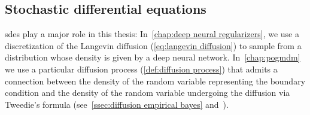 \subsection{Stochastic differential equations}
\Glspl{sde} play a major role in this thesis:
In~\cref{chap:deep neural regularizers}, we use a discretization of the Langevin diffusion (\cref{eq:langevin diffusion}) to sample from a distribution whose density is given by a deep neural network.
In~\cref{chap:pogmdm} we use a particular diffusion process (\cref{def:diffusion process}) that admits a connection between the density of the random variable representing the boundary condition and the density of the random variable undergoing the diffusion via Tweedie's formula (see~\cref{ssec:diffusion empirical bayes} and~\cite{raphan_least_2011,robbins_empirical_1956}).

